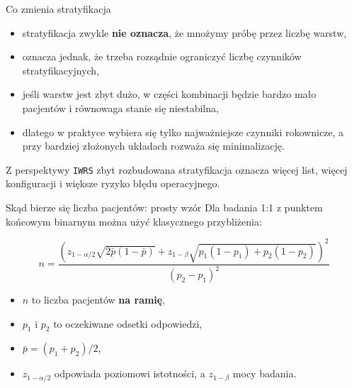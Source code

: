 \begin{frame}{Co zmienia stratyfikacja}
  \begin{itemize}
    \item stratyfikacja zwykle \textbf{nie oznacza}, że mnożymy próbę przez liczbę warstw,
    \item oznacza jednak, że trzeba rozsądnie ograniczyć liczbę czynników stratyfikacyjnych,
    \item jeśli warstw jest zbyt dużo, w części kombinacji będzie bardzo mało pacjentów i równowaga stanie się niestabilna,
    \item dlatego w praktyce wybiera się tylko najważniejsze czynniki rokownicze, a przy bardziej złożonych układach rozważa się minimalizację.
  \end{itemize}

  \vspace{0.2cm}

  \begin{WarningBox}
    Z perspektywy \texttt{IWRS} zbyt rozbudowana stratyfikacja oznacza więcej list, więcej konfiguracji i większe ryzyko błędu operacyjnego.
  \end{WarningBox}
\end{frame}

\begin{frame}{Skąd bierze się liczba pacjentów: prosty wzór}
  \small
  Dla badania 1:1 z punktem końcowym binarnym można użyć klasycznego przybliżenia:

  \[
  n =
  \frac{
    \left(
      z_{1-\alpha/2}\sqrt{2\bar{p}(1-\bar{p})}
      +
      z_{1-\beta}\sqrt{p_1(1-p_1)+p_2(1-p_2)}
    \right)^2
  }{
    (p_2-p_1)^2
  }
  \]

  \vspace{0.1cm}

  \begin{itemize}
    \item \(n\) to liczba pacjentów \textbf{na ramię},
    \item \(p_1\) i \(p_2\) to oczekiwane odsetki odpowiedzi,
    \item \(\bar{p}=(p_1+p_2)/2\),
    \item \(z_{1-\alpha/2}\) odpowiada poziomowi istotności, a \(z_{1-\beta}\) mocy badania.
  \end{itemize}
\end{frame}

